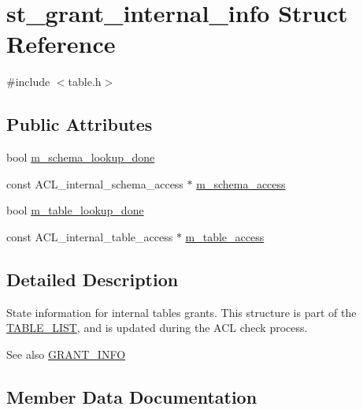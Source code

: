 \hypertarget{structst__grant__internal__info}{}\section{st\+\_\+grant\+\_\+internal\+\_\+info Struct Reference}
\label{structst__grant__internal__info}


{\ttfamily \#include $<$table.\+h$>$}

\subsection*{Public Attributes}
\begin{DoxyCompactItemize}
\item 
bool \mbox{\hyperlink{structst__grant__internal__info_aa4d19ba7b520900124141b8791164d10}{m\+\_\+schema\+\_\+lookup\+\_\+done}}
\item 
const A\+C\+L\+\_\+internal\+\_\+schema\+\_\+access $\ast$ \mbox{\hyperlink{structst__grant__internal__info_aec9e5211996315052a77537b1ef9fb1a}{m\+\_\+schema\+\_\+access}}
\item 
bool \mbox{\hyperlink{structst__grant__internal__info_a7090d20ebfb36c89ab1ebb1ecb44ee6e}{m\+\_\+table\+\_\+lookup\+\_\+done}}
\item 
const A\+C\+L\+\_\+internal\+\_\+table\+\_\+access $\ast$ \mbox{\hyperlink{structst__grant__internal__info_abd72783bc9bc5ac6ab3e7871d5ef4c19}{m\+\_\+table\+\_\+access}}
\end{DoxyCompactItemize}


\subsection{Detailed Description}
State information for internal tables grants. This structure is part of the \mbox{\hyperlink{structTABLE__LIST}{T\+A\+B\+L\+E\+\_\+\+L\+I\+ST}}, and is updated during the A\+CL check process. \begin{DoxySeeAlso}{See also}
\mbox{\hyperlink{structGRANT__INFO}{G\+R\+A\+N\+T\+\_\+\+I\+N\+FO}} 
\end{DoxySeeAlso}


\subsection{Member Data Documentation}
\mbox{\label{structst__grant__internal__info_aec9e5211996315052a77537b1ef9fb1a}} 
